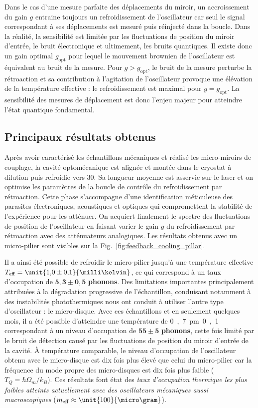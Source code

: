 \documentclass[12pt,a4paper]{article}
\begin{document}
Dans le cas d'une mesure parfaite des déplacements du miroir, un accroissement du gain $g$ entraine toujours un refroidissement de l'oscillateur car seul le signal correspondant à ses déplacements est mesuré puis réinjecté dans la boucle.
Dans la réalité, la sensibilité est limitée par les fluctuations de position du miroir d'entrée, le bruit électronique et ultimement, les bruits quantiques.
Il existe donc un gain optimal $g_\mathrm{opt}$ pour lequel le mouvement brownien de l'oscillateur est équivalent au bruit de la mesure.
Pour $g>g_\mathrm{opt}$, le bruit de la mesure perturbe la rétroaction et sa contribution à l'agitation de l'oscillateur provoque une élévation de la température effective : le refroidissement est maximal pour $g=g_\mathrm{opt}$.
La sensibilité des mesures de déplacement est donc l'enjeu majeur pour atteindre l'état quantique fondamental.

\subsection{Principaux résultats obtenus}
\label{sec:results}

Après avoir caractérisé les échantillons mécaniques et réalisé les micro-miroirs de couplage, la cavité optomécanique est alignée et montée dans le cryostat à dilution puis refroidie vers \unit{30}{\milli\kelvin}.
Sa longueur moyenne est asservie sur le laser et on optimise les paramètres de la boucle de contrôle du refroidissement par rétroaction.
Cette phase s'accompagne d'une identification méticuleuse des parasites électroniques, acoustiques et optiques qui compromettent la stabilité de l'expérience pour les atténuer.
On acquiert finalement le spectre des fluctuations de position de l'oscillateur en faisant varier le gain $g$ du refroidissement par rétroaction avec des atténuateurs analogiques.
Les résultats obtenus avec un micro-pilier sont visibles sur la Fig.~\ref{fig:feedback_cooling_pillar}.

Il a ainsi été possible de refroidir le micro-pilier jusqu'à une température effective $T_\mathrm{eff} = \unit{1{,}0\pm 0{,}1}{\milli\kelvin}$, ce qui correspond à un taux d'occupation de $\mathbf{5{,}3 \pm 0{,}5}$ \textbf{phonons}.
Des limitations importantes principalement attribuées à la dégradation progressive de l'échantillon, conduisant notamment à des instabilités photothermiques nous ont conduit à utiliser l'autre type d'oscillateur : le micro-disque.
Avec ces échantillons et en seulement quelques mois, il a été possible d'atteindre une température de \unit{0{,}7\pm 0{,}1}{\milli\kelvin} correspondant à un niveau d'occupation de $\mathbf{55\pm5}$ \textbf{phonons}, cette fois limité par le bruit de détection causé par les fluctuations de position du miroir d'entrée de la cavité.
À température comparable, le niveau d'occupation de l'oscillateur obtenu avec le micro-disque est dix fois plus élevé que celui du micro-pilier car la fréquence du mode propre des micro-disques est dix fois plus faible ($T_Q = \hbar\Omega_m/k_B$).
Ces résultats font état des \textit{taux d'occupation thermique les plus faibles atteints actuellement avec des oscillateurs mécaniques aussi macroscopiques} ($m_\mathrm{eff}\approx\unit{100}{\micro\gram}$). 
\end{document}
